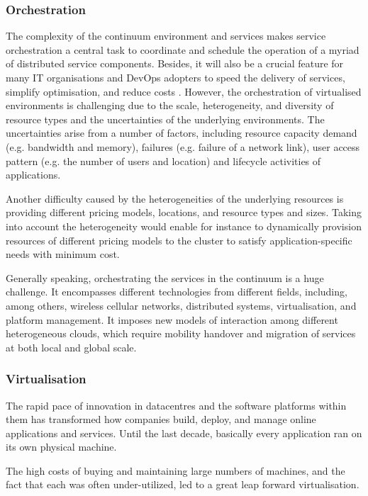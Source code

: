 \documentclass{ieeeaccess}
\begin{document}
\subsubsection{Orchestration}

The complexity of the continuum environment and services makes service orchestration a central task to coordinate and schedule the operation of a myriad of distributed service components. Besides, it will also be a crucial feature for many IT organisations and DevOps adopters to speed the delivery of services, simplify optimisation, and reduce costs \cite{akamai}. However, the orchestration of virtualised environments is challenging due to the scale, heterogeneity, and diversity of resource types and the uncertainties of the underlying environments. The uncertainties arise from a number of factors, including resource capacity demand (e.g. bandwidth and memory), failures (e.g. failure of a network link), user access pattern (e.g. the number of users and location) and lifecycle activities of applications.

Another difficulty caused by the heterogeneities of the underlying resources is providing different pricing models, locations, and resource types and sizes. Taking into account the heterogeneity would enable for instance to dynamically provision resources of different pricing models to the cluster to satisfy application-specific needs with minimum cost.

Generally speaking, orchestrating the services in the continuum is a huge challenge. It encompasses different technologies from different fields, including, among others, wireless cellular networks, distributed systems, virtualisation, and platform management. It imposes new models of interaction among different heterogeneous clouds, which require mobility handover and migration of services at both local and global scale.

\subsubsection{Virtualisation}
\label{sec:virtualisation}

The rapid pace of innovation in datacentres and the software platforms within them has transformed how companies build, deploy, and manage online applications and services. Until the last decade, basically every application ran on its own physical machine.

The high costs of buying and maintaining large numbers of machines, and the fact that each was often under-utilized, led to a great leap forward virtualisation.
\end{document}
